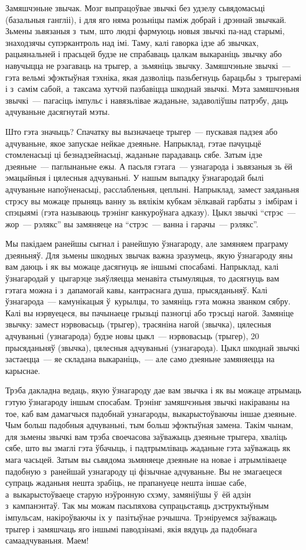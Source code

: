 Замяшчэньне звычак. Мозг выпрацоўвае звычкі без удзелу сьвядомасьці (базальныя гангліі), і для яго няма розьніцы паміж добрай і дрэннай звычкай. Зьмены зьвязаныя з~тым, што людзі фармуюць новыя звычкі па-над старымі, знаходзячы супэркантроль над імі. Таму, калі гаворка ідзе аб звычках, рацыянальней і прасьцей будзе не спрабаваць цалкам выкараніць звычку або навучыцца не рэагаваць на трыгер, а~зьмяніць звычку. Замяшчэньне звычкі~--- гэта вельмі эфэктыўная тэхніка, якая дазволіць пазьбегнуць барацьбы з~трыгерамі і з~самім сабой, а~таксама хутчэй пазбавіцца шкоднай звычкі. Мэта замяшчэньня звычкі~--- пагасіць імпульс і навязьлівае жаданьне, задаволіўшы патрэбу, даць адчуваньне дасягнутай мэты.

Што гэта значыць? Спачатку вы вызначаеце трыгер~--- пускавая падзея або адчуваньне, якое запускае нейкае дзеяньне. Напрыклад, гэтае пачуцьцё стомленасьці ці безнадзейнасьці, жаданьне парадаваць сябе. Затым ідзе дзеяньне~--- паглынаньне ежы. А пасьля гэтага~--- узнагарода і зьвязаныя зь ёй эмацыйныя і цялесныя адчуваньні. У нашым выпадку ўзнагародай былі адчуваньне напоўненасьці, расслабленьня, цеплыні. Напрыклад, замест заяданьня стрэсу вы можаце прыняць ванну зь вялікім кубкам зёлкавай гарбаты з~імбірам і спэцыямі (гэта называюць трэнінг канкуроўнага адказу). Цыкл звычкі ``стрэс~--- жор~--- рэлякс'' вы замяняеце на ``стрэс~--- ванна і гарачы~--- рэлякс''.

Мы пакідаем ранейшы сыгнал і ранейшую ўзнагароду, але замяняем праграму дзеяньняў. Для зьмены шкодных звычак важна зразумець, якую ўзнагароду яны вам даюць і як вы можаце дасягнуць яе іншымі спосабамі. Напрыклад, калі ўзнагародай у~цыгарэце зьяўляецца менавіта стымуляцыя, то дасягнуць вам гэтага можна і з~дапамогай кавы, кантраснага душа, прысяданьняў. Калі ўзнагарода~--- камунікацыя ў~курылцы, то замяніць гэта можна званком сябру. Калі вы нэрвуецеся, вы пачынаеце грызьці пазногці або трэсьці нагой. Замяніце звычку: замест нэрвовасьць (трыгер), трасяніна нагой (звычка), цялесныя адчуваньні (узнагарода) будзе новы цыкл~--- нэрвовасьць (трыгер), 20 прысяданьняў (звычка), цялесныя адчуваньні (узнагарода). Цыкл шкоднай звычкі застаецца~--- яе складана выкараніць,~--- але само дзеяньне замяняецца на карыснае.

Трэба дакладна ведаць, якую ўзнагароду дае вам звычка і як вы можаце атрымаць гэтую ўзнагароду іншым спосабам. Трэнінг замяшчэньня звычкі накіраваны на тое, каб вам дамагчыся падобнай узнагароды, выкарыстоўваючы іншае дзеяньне. Чым больш падобныя адчуваньні, тым больш эфэктыўная замена. Такім чынам, для зьмены звычкі вам трэба своечасова заўважыць дзеяньне трыгера, хваліць сябе, што вы змаглі гэта ўбачыць, і падтрымліваць жаданьне гэта заўважаць як мага часьцей. Затым вы сьвядома зьмяняеце дзеяньне на новае і атрымліваеце падобную з~ранейшай узнагароду ці фізычнае адчуваньне. Вы не змагаецеся супраць жаданьня нешта зрабіць, не прапануеце нешта іншае сабе, а~выкарыстоўваеце старую нэўронную схэму, замяніўшы ў~ёй адзін з~кампанэнтаў. Так мы можам пасьпяхова супрацьстаяць дэструктыўным імпульсам, накіроўваючы іх у~пазітыўнае рэчышча. Трэніруемся заўважаць трыгер і замяшчаць яго іншымі паводзінамі, якія вядуць да падобнага самаадчуваньня. Маем!

